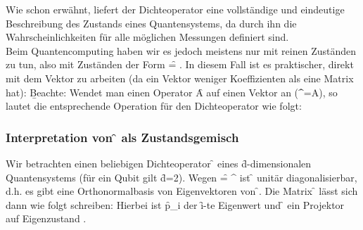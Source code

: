 Wie schon erwähnt, liefert der Dichteoperator eine vollständige und eindeutige Beschreibung des Zustands eines Quantensystems, da durch ihn die Wahrscheinlichkeiten für alle möglichen Messungen definiert sind.\\
Beim Quantencomputing haben wir es jedoch meistens nur mit reinen Zuständen zu tun, also mit Zuständen der Form \f{\varrho = \cket{\psi}\cbra{\psi}}. In diesem Fall ist es praktischer, direkt mit dem Vektor \ket{\psi} zu arbeiten (da ein Vektor weniger Koeffizienten als eine Matrix hat):
\b{Beachte:} Wendet man einen Operator \f{A} auf einen Vektor \ket{\psi} an (\f{\cket{\psi}^\prime=A\cket{\psi}}), so lautet die entsprechende Operation für den Dichteoperator wie folgt:

\vspace{1cm}
\subsubsection*{Interpretation von \f{\varrho} als Zustandsgemisch}
Wir betrachten einen beliebigen Dichteoperator \f{\varrho} eines \f{d}-dimensionalen Quantensystems (für ein Qubit gilt \f{d=2}). Wegen \f{\varrho = \varrho^\dagger} ist \f{\varrho} unitär diagonalisierbar, d.h. es gibt eine Orthonormalbasis von Eigenvektoren von \f{\varrho}. Die Matrix \f{\varrho} lässt sich dann wie folgt schreiben:
Hierbei ist \f{p_i} der \f{i}-te Eigenwert und \f{} ein Projektor auf Eigenzustand .\\

